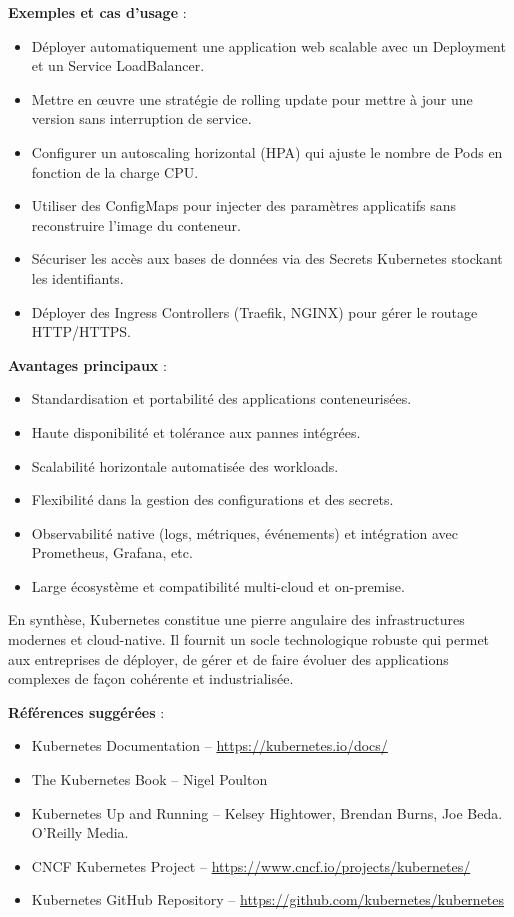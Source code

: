 \textbf{Exemples et cas d’usage} :
\begin{itemize}
	\item Déployer automatiquement une application web scalable avec un Deployment et un Service LoadBalancer.
	\item Mettre en œuvre une stratégie de rolling update pour mettre à jour une version sans interruption de service.
	\item Configurer un autoscaling horizontal (HPA) qui ajuste le nombre de Pods en fonction de la charge CPU.
	\item Utiliser des ConfigMaps pour injecter des paramètres applicatifs sans reconstruire l’image du conteneur.
	\item Sécuriser les accès aux bases de données via des Secrets Kubernetes stockant les identifiants.
	\item Déployer des Ingress Controllers (Traefik, NGINX) pour gérer le routage HTTP/HTTPS.
\end{itemize}

\textbf{Avantages principaux} :
\begin{itemize}
	\item Standardisation et portabilité des applications conteneurisées.
	\item Haute disponibilité et tolérance aux pannes intégrées.
	\item Scalabilité horizontale automatisée des workloads.
	\item Flexibilité dans la gestion des configurations et des secrets.
	\item Observabilité native (logs, métriques, événements) et intégration avec Prometheus, Grafana, etc.
	\item Large écosystème et compatibilité multi-cloud et on-premise.
\end{itemize}

En synthèse, Kubernetes constitue une pierre angulaire des infrastructures modernes et cloud-native. Il fournit un socle technologique robuste qui permet aux entreprises de déployer, de gérer et de faire évoluer des applications complexes de façon cohérente et industrialisée.

\textbf{Références suggérées} :
\begin{itemize}
	\item Kubernetes Documentation – \url{https://kubernetes.io/docs/}
	\item The Kubernetes Book – Nigel Poulton
	\item Kubernetes Up and Running – Kelsey Hightower, Brendan Burns, Joe Beda. O’Reilly Media.
	\item CNCF Kubernetes Project – \url{https://www.cncf.io/projects/kubernetes/}
	\item Kubernetes GitHub Repository – \url{https://github.com/kubernetes/kubernetes}
\end{itemize}

